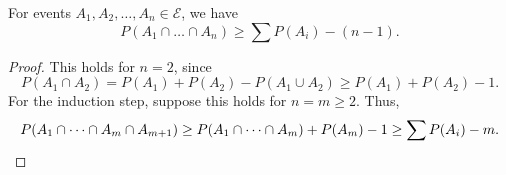 \documentclass[11pt]{article}
\theoremstyle{definition}
\theoremstyle{remark}
\numberwithin{equation}{module}
\begin{document}
    \begin{theorem}
        For events $A_1, A_2, \dots, A_n \in \mathcal{E}$, we have \[
            P(A_1 \cap \dots \cap A_n) \geq \sum P(A_i) - (n - 1).
        \] 
    \end{theorem}
    \begin{proof}
        This holds for $n = 2$, since \[
            P(A_1 \cap A_2) = P(A_1) + P(A_2) - P(A_1 \cup A_2) \geq P(A_1) +
            P(A_2) - 1.
        \]
        For the induction step, suppose this holds for $n = m \geq 2$. Thus, \[
            P(A_1 \cap \dots \cap A_m \cap A_{m + 1}) \geq P(A_1 \cap \dots \cap
            A_m) + P(A_m) - 1 \geq \sum P(A_i) - m. \qedhere
        \] 
    \end{proof}
\end{document}
